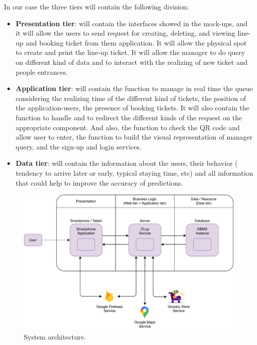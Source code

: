 In our case the three tiers will contain the following division:
\begin{itemize}
	\item \textbf{Presentation tier}: will contain the interfaces showed in the mock-ups, and it will allow the users to send request for creating, deleting, and viewing line-up and booking ticket from them application. It will allow the physical spot to create and print the line-up ticket. It will allow the manager to do query on different kind of data and to interact with the realizing of new ticket and people entrances. 

	\item \textbf{Application tier}: will contain the function to manage in real time the queue considering the realizing time of the different kind of tickets, the position of the application-users, the presence of booking tickets. It will also contain the function to handle and to redirect the different kinds of the request on the appropriate component. And also, the function to check the QR code and allow user to enter, the function to build the visual representation of manager query, and the sign-up and login services.

	\item \textbf{Data tier}: will contain the information about the users, their behavior ( tendency to arrive later or early, typical staying time, etc) and all information that could help to improve the accuracy of predictions.
\end{itemize}

\begin{figure}[H]
	\centering
	\includegraphics[width=1.0\textwidth]{images/architecture.pdf}
	\caption{System architecture.}
\end{figure}

